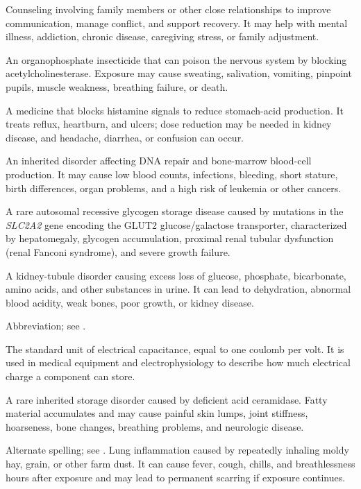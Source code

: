  Counseling involving family members or other close relationships to improve communication, manage conflict, and support recovery. It may help with mental illness, addiction, chronic disease, caregiving stress, or family adjustment.

 An organophosphate insecticide that can poison the nervous system by blocking acetylcholinesterase. Exposure may cause sweating, salivation, vomiting, pinpoint pupils, muscle weakness, breathing failure, or death.

 A medicine that blocks histamine signals to reduce stomach-acid production. It treats reflux, heartburn, and ulcers; dose reduction may be needed in kidney disease, and headache, diarrhea, or confusion can occur.

 An inherited disorder affecting DNA repair and bone-marrow blood-cell production. It may cause low blood counts, infections, bleeding, short stature, birth differences, organ problems, and a high risk of leukemia or other cancers.

 A rare autosomal recessive glycogen storage disease caused by mutations in the \textit{SLC2A2} gene encoding the GLUT2 glucose/galactose transporter, characterized by hepatomegaly, glycogen accumulation, proximal renal tubular dysfunction (renal Fanconi syndrome), and severe growth failure.

 A kidney-tubule disorder causing excess loss of glucose, phosphate, bicarbonate, amino acids, and other substances in urine. It can lead to dehydration, abnormal blood acidity, weak bones, poor growth, or kidney disease.

 Abbreviation; see .

 The standard unit of electrical capacitance, equal to one coulomb per volt. It is used in medical equipment and electrophysiology to describe how much electrical charge a component can store.

 A rare inherited storage disorder caused by deficient acid ceramidase. Fatty material accumulates and may cause painful skin lumps, joint stiffness, hoarseness, bone changes, breathing problems, and neurologic disease.

 Alternate spelling; see .
 Lung inflammation caused by repeatedly inhaling moldy hay, grain, or other farm dust. It can cause fever, cough, chills, and breathlessness hours after exposure and may lead to permanent scarring if exposure continues.

